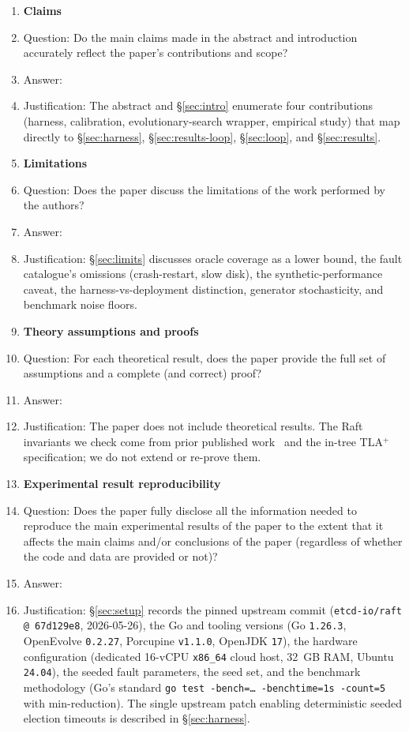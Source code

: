 \documentclass{article}
\begin{document}
\begin{enumerate}

\item {\bf Claims}
    \item[] Question: Do the main claims made in the abstract and introduction accurately reflect the paper's contributions and scope?
    \item[] Answer: \answerYes{}
    \item[] Justification: The abstract and \S\ref{sec:intro} enumerate four contributions (harness, calibration, evolutionary-search wrapper, empirical study) that map directly to \S\ref{sec:harness}, \S\ref{sec:results-loop}, \S\ref{sec:loop}, and \S\ref{sec:results}.

\item {\bf Limitations}
    \item[] Question: Does the paper discuss the limitations of the work performed by the authors?
    \item[] Answer: \answerYes{}
    \item[] Justification: \S\ref{sec:limits} discusses oracle coverage as a lower bound, the fault catalogue's omissions (crash-restart, slow disk), the synthetic-performance caveat, the harness-vs-deployment distinction, generator stochasticity, and benchmark noise floors.

\item {\bf Theory assumptions and proofs}
    \item[] Question: For each theoretical result, does the paper provide the full set of assumptions and a complete (and correct) proof?
    \item[] Answer: \answerNA{}
    \item[] Justification: The paper does not include theoretical results. The Raft invariants we check come from prior published work~\cite{ongaro2014search} and the in-tree TLA$^{+}$ specification; we do not extend or re-prove them.

    \item {\bf Experimental result reproducibility}
    \item[] Question: Does the paper fully disclose all the information needed to reproduce the main experimental results of the paper to the extent that it affects the main claims and/or conclusions of the paper (regardless of whether the code and data are provided or not)?
    \item[] Answer: \answerYes{}
    \item[] Justification: \S\ref{sec:setup} records the pinned upstream commit (\texttt{etcd-io/raft @ 67d129e8}, 2026-05-26), the Go and tooling versions (Go \texttt{1.26.3}, OpenEvolve \texttt{0.2.27}, Porcupine \texttt{v1.1.0}, OpenJDK \texttt{17}), the hardware configuration (dedicated 16-vCPU \texttt{x86\_64} cloud host, 32~GB RAM, Ubuntu \texttt{24.04}), the seeded fault parameters, the seed set, and the benchmark methodology (Go's standard \texttt{go test -bench=\dots{} -benchtime=1s -count=5} with min-reduction). The single upstream patch enabling deterministic seeded election timeouts is described in \S\ref{sec:harness}.


\end{enumerate}
\end{document}
